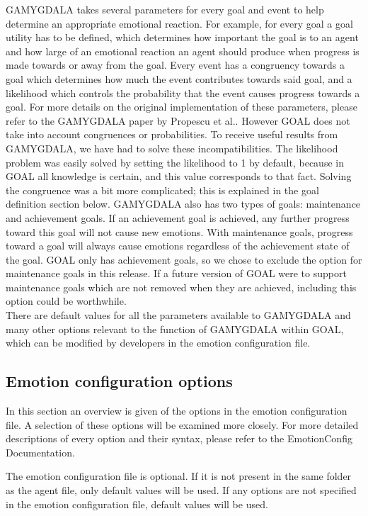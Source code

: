 \documentclass[11pt]{article}
\begin{document}
GAMYGDALA takes several parameters for every goal and event to help determine an appropriate emotional reaction. For example, for every goal a goal utility has to be defined, which determines how important the goal is to an agent and how large of an emotional reaction an agent should produce when progress is made towards or away from the goal. Every event has a congruency towards a goal which determines how much the event contributes towards said goal, and a likelihood which controls the probability that the event causes progress towards a goal. For more details on the original implementation of these parameters, please refer to the GAMYGDALA paper by Propescu et al.\cite{GAMYGDALA}. However GOAL does not take into account congruences or probabilities. To receive useful results from GAMYGDALA, we have had to solve these incompatibilities. The likelihood problem was easily solved by setting the likelihood to 1 by default, because in GOAL all knowledge is certain, and this value corresponds to that fact. Solving the congruence was a bit more complicated; this is explained in the goal definition section below.
GAMYGDALA also has two types of goals: maintenance and achievement goals. If an achievement goal is achieved, any further progress toward this goal will not cause new emotions. With maintenance goals, progress toward a goal will always cause emotions regardless of the achievement state of the goal. GOAL only has achievement goals, so we chose to exclude the option for maintenance goals in this release. If a future version of GOAL were to support maintenance goals which are not removed when they are achieved, including this option could be worthwhile.\\
There are default values for all the parameters available to GAMYGDALA and many other options relevant to the function of GAMYGDALA within GOAL, which can be modified by developers in the emotion configuration file.


\subsection{Emotion configuration options}
In this section an overview is given of the options in the emotion configuration file. A selection of these options will be examined more closely. For more detailed descriptions of every option and their syntax, please refer to the EmotionConfig Documentation\cite{emotionconfig}. 

The emotion configuration file is optional. If it is not present in the same folder as the agent file, only default values will be used. If any options are not specified in the emotion configuration file, default values will be used.
\end{document}
